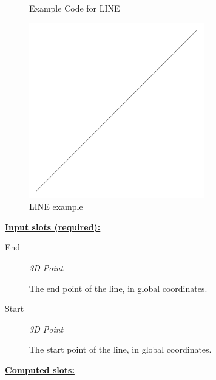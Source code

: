 \documentclass [11pt]{book}
\begin{document}
\begin{itemize}
\begin{figure}
\caption{Example Code for LINE}

\label{fig:example-code-LINE}

\end{figure}

\begin{figure}
\begin{center}
\includegraphics[width=3in,height=3in]{../images/example-line.pdf}
\end{center}

\caption{LINE example}

\label{fig:LINE}

\end{figure}





\textbf{
\underline{Input slots (required):}}

\begin{description}

\item [End]
\emph{3D Point}

 The end point of the line, in global coordinates.




\item [Start]
\emph{3D Point}

 The start point of the line, in global coordinates.




\end{description}






\textbf{
\underline{Computed slots:}}

\begin{description}


\end{description}
\end{itemize}
\end{document}
